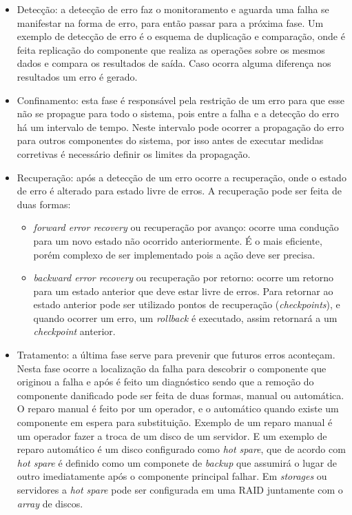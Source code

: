 \begin{itemize}
 \item Detecção: a detecção de erro faz o monitoramento e aguarda uma falha se manifestar na forma de erro, para então
 passar para a próxima fase. Um exemplo de detecção de erro é o esquema de duplicação e comparação, onde é feita replicação do componente
 que realiza as operações sobre os mesmos dados e compara os resultados de saída. Caso ocorra alguma diferença nos resultados um erro é gerado.
 \item Confinamento: esta fase é responsável pela restrição de um erro para que esse não se propague para todo o sistema, pois entre a falha e a
 detecção do erro há um intervalo de tempo. Neste intervalo pode ocorrer a propagação do erro para outros componentes do sistema, por isso 
 antes de executar medidas corretivas é necessário definir os limites da propagação.
 \item Recuperação: após a detecção de um erro ocorre a recuperação, onde o estado de erro é alterado para estado livre de erros. A recuperação
 pode ser feita de duas formas:
 \begin{itemize}
  \item \textit{forward error recovery} ou recuperação por avanço: ocorre uma condução para um novo estado não ocorrido anteriormente. É o mais 
  eficiente, porém complexo de ser implementado pois a ação deve ser precisa.
  \item \textit{backward error recovery} ou recuperação por retorno: ocorre um retorno para um estado anterior que deve estar livre de erros.
  Para retornar ao estado anterior pode ser utilizado pontos de recuperação (\textit{checkpoints}), e quando ocorrer um erro, um \textit{rollback} 
  é executado, assim retornará a um \textit{checkpoint} anterior.
 \end{itemize}
 \item Tratamento: a última fase serve para prevenir que futuros erros aconteçam. Nesta fase ocorre a localização da falha para descobrir o 
 componente que originou a falha e após é feito um diagnóstico sendo que a remoção do componente danificado pode ser feita de duas formas, 
 manual ou automática. O reparo manual é feito por um operador, e o automático quando existe um componente em espera para substituição.
 Exemplo de um reparo manual é um operador fazer a troca de um disco de um servidor. E um exemplo de reparo automático é um disco configurado
 como \textit{hot spare}, que de acordo com \cite{rouse2013} \textit{hot spare} é definido como um componete de \textit{backup} que assumirá 
 o lugar de outro imediatamente após o componente principal falhar. Em \textit{storages} ou servidores a \textit{hot spare} pode ser configurada 
 em uma  \ac{RAID} juntamente com o \textit{array} de discos.
\end{itemize}

